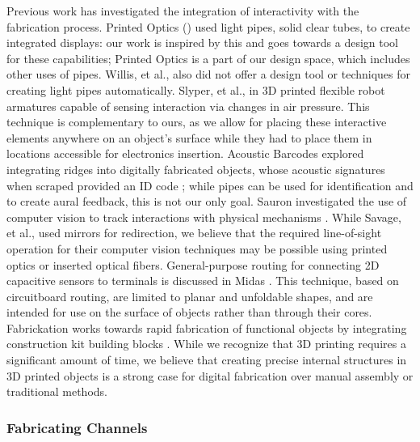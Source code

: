 Previous work has investigated the integration of interactivity with the fabrication process.  Printed Optics (\cite{Willis-printedoptics}) used light pipes, solid clear tubes, to create integrated displays: our work is inspired by this and goes towards a design tool for these capabilities; Printed Optics is a part of our design space, which includes other uses of pipes.  Willis, et al., also did not offer a design tool or techniques for creating light pipes automatically.  Slyper, et al., in \cite{Slyper-pressure} 3D printed flexible robot armatures capable of sensing interaction via changes in air pressure.  This technique is complementary to ours, as we allow for placing these interactive elements anywhere on an object's surface while they had to place them in locations accessible for electronics insertion. Acoustic Barcodes explored integrating ridges into digitally fabricated objects, whose acoustic signatures when scraped provided an ID code \cite{Harrison-acoustic}; while pipes can be used for identification and to create aural feedback, this is not our only goal.   Sauron investigated the use of computer vision to track interactions with physical mechanisms \cite{Savage-sauron}.  While Savage, et al., used mirrors for redirection, we believe that the required line-of-sight operation for their computer vision techniques may be possible using printed optics or inserted optical fibers.  General-purpose routing for connecting 2D capacitive sensors to terminals is discussed in Midas \cite{Savage-midas}.  This technique, based on circuitboard routing, are limited to planar and unfoldable shapes, and are intended for use on the surface of objects rather than through their cores.  Fabrickation works towards rapid fabrication of functional objects by integrating construction kit building blocks \cite{Mueller-fabrickation}.  While we recognize that 3D printing requires a significant amount of time, we believe that creating precise internal structures in 3D printed objects is a strong case for digital fabrication over manual assembly or traditional methods.

\subsubsection{Fabricating Channels}

